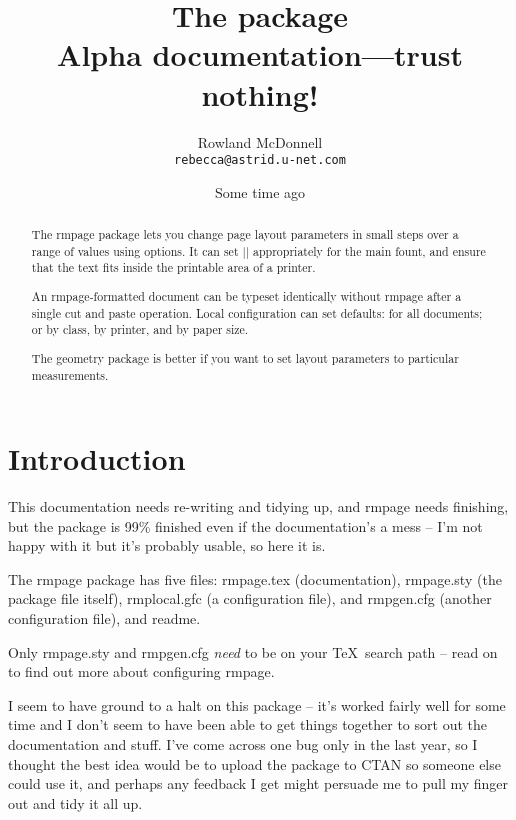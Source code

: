 \documentclass[11pt,loose,twoside,touchwider,longish,
                      noheaders,a4paper,notstdmargins]{report}
\author{Rowland McDonnell\\
\texttt{rebecca@astrid.u-net.com}}
\title{The \packname{rmpage} package\\Alpha documentation---trust
nothing!}
\date{Some time ago}
\newcommand*{\filename}[1]{{\ttfamily #1}}
\newcommand*{\packname}[1]{{\sffamily #1}}
\newcommand*{\classname}[1]{{\ttfamily #1}}
\newcommand*{\rmpage}{\classname{rmpage}\xspace}
\begin{document}
\maketitle

\begin{abstract}

The \rmpage package lets you change page layout parameters in small
steps over a range of values using options.  It can set |\textwidth|
appropriately for the main fount, and ensure that the text fits inside
the printable area of a printer.

An \rmpage-formatted document can be typeset identically without
\rmpage after a single cut and paste operation.  Local configuration
can set defaults: for all documents; or by class, by printer, and by
paper size.

The geometry package is better if you want to set layout parameters to
particular measurements.

\end{abstract}


\tableofcontents

\chapter{Introduction}

This documentation needs re-writing and tidying up, and \rmpage needs 
finishing, but the package is 99\% finished even if the
documentation's a mess -- I'm not happy with it but it's probably 
usable, so here it is.

The \packname{rmpage} package has five files: 
\filename{rmpage.tex} (documentation), \filename{rmpage.sty} (the 
package file itself), \filename{rmplocal.gfc} (a configuration file), 
and \filename{rmpgen.cfg} (another configuration file), and 
\filename{readme}.

Only \filename{rmpage.sty} and \filename{rmpgen.cfg} \emph{need} to be 
on your \TeX\ search path -- read on to find out more about 
configuring \packname{rmpage}.

I seem to have ground to a halt on this package -- it's worked fairly 
well for some time and I don't seem to have been able to get things 
together to sort out the documentation and stuff.  I've come across 
one bug only in the last year, so I thought the best idea would be to 
upload the package to CTAN so someone else could use it, and perhaps 
any feedback I get might persuade me to pull my finger out and tidy it 
all up.
\end{document}
